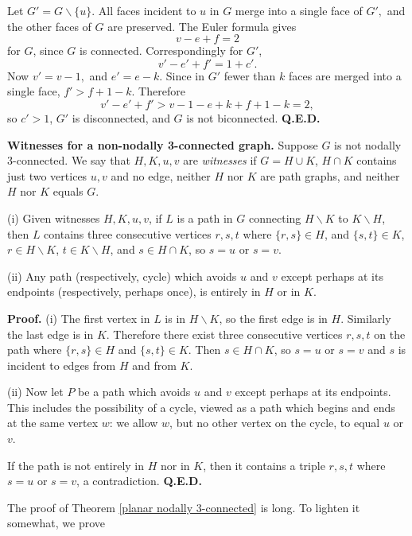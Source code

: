 Let $G' = G\backslash \{u\}$. All faces incident to $u$ in $G$
merge into a single face of $G',$ and the other faces of $G$
are preserved.
The Euler formula gives
$$ v - e + f = 2$$ for $G$, since $G$ is connected.  Correspondingly
for $G'$,
$$ v' - e' + f' = 1 + c'.$$ Now $v' = v-1,$ and $e' = e - k$.
Since in $G'$ fewer than $k$ faces are merged into a single face,
$f' > f+1-k$. Therefore
$$ v' - e' + f' > v-1 - e + k + f + 1 - k = 2,$$ so $c' > 1$,
$G'$ is disconnected, and $G$ is not biconnected. {\bf Q.E.D.}\medskip

\numpara
\label{witnesses} {\bf Witnesses for a non-nodally 3-connected graph.}
Suppose $G$ is not nodally 3-connected.  We
say that $H,K,u,v$ are {\em witnesses} if $G=H\cup K$,
$H\cap K$ contains just two vertices $u,v$ and no edge,
neither $H$ nor $K$ are path graphs, and neither $H$ nor $K$
equals $G$.

\begin{lemma}
\label{edges incident from H and K} {\rm (i)}
Given witnesses $H,K,u,v$, if $L$ is a path in $G$
connecting $H\backslash K$ to $K\backslash H$,
then $L$ contains three consecutive vertices $r,s,t$ where
$\{r,s\}\in H$, and $\{s,t\}\in K$, $r\in H\backslash K$,
$t\in K\backslash H$, and $s \in H\cap K$, so $s=u$ or $s=v$.

{\rm (ii)} Any path (respectively, cycle) which avoids $u$ and $v$ except
perhaps at its endpoints
(respectively, perhaps once), is entirely in $H$
or in $K$.
\end{lemma}

{\bf Proof.} (i) The first vertex in $L$ is in $H\backslash K$,
so the first edge is in $H$.  Similarly the last edge is in $K$.
Therefore there exist three consecutive vertices $r,s,t$
on the path where $\{r,s\} \in H$ and $\{s,t\}\in K$.
Then $s\in H\cap K$, so $s=u$ or $s=v$ and $s$ is
incident to edges from $H$ and from $K$.

(ii)
Now let $P$ be a path which avoids $u$ and $v$
except perhaps at its endpoints. This includes the
possibility of a cycle, viewed as a path which
begins and ends at the same vertex $w$: we allow
$w$, but no other vertex on the cycle, to equal
$u$ or $v$.

If the path is not entirely
in $H$ nor in $K$, then it contains a triple
$r,s,t$ where $s = u$ or $s=v$, a contradiction. {\bf Q.E.D.}\medskip



The proof of
Theorem \ref{planar nodally 3-connected} is long.  To lighten
it somewhat, we prove

